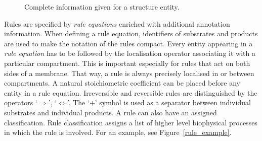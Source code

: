 \documentclass[12pt]{fithesis2}
\begin{document}
\begin{figure}[!h]
\begin{center}
\end{center}
\caption{Complete information given for a structure entity.}\label{structure_example}
\end{figure}

Rules are specified by \emph{rule equations} enriched with additional annotation information. When defining a rule equation, identifiers of substrates and products are used to make the notation of the rules compact. Every entity appearing in a \emph{rule equation} has to be followed by the localisation operator associating it with a particular compartment. This is important especially for rules that act on both sides of a membrane. That way, a rule is always precisely localised in or between compartments. A natural stoichiometric coefficient can be placed before any entity in a rule equation. Irreversible and reversible rules are distinguished by the operators `$\Rightarrow$', `$\Leftrightarrow$'. The `$+$' symbol is used as a separator between individual substrates and individual products. A rule can also have an assigned classification. Rule classification assigns a list of higher level biophysical processes in which the rule is involved. For an example, see Figure~\ref{rule_example}.
\end{document}
